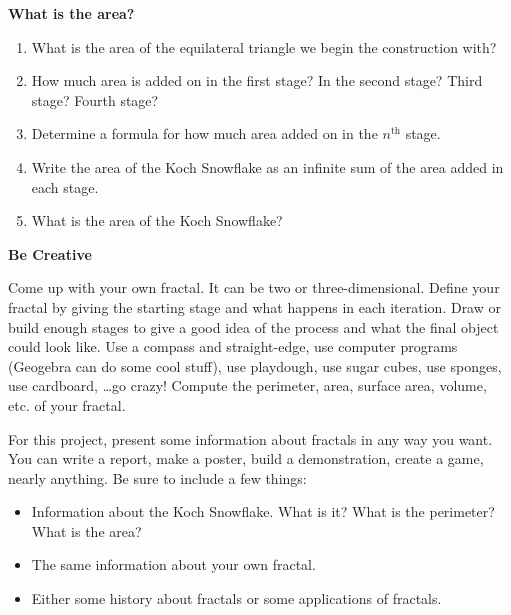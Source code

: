 \documentclass[12pt]{amsart}
\begin{document}
\vfill

{\bf What is the area?}

\medskip

\begin{enumerate}

\item  What is the area of the equilateral triangle we begin the construction with?

\bigskip

\item  How much area is added on in the first stage?  In the second stage? Third stage? Fourth stage? 

\bigskip

\item  Determine a formula for how much area added on in the $n^\text{th}$ stage.

\bigskip

\item  Write the area of the Koch Snowflake as an infinite sum of the area added in each stage.

\bigskip

\item  What is the area of the Koch Snowflake?

\bigskip

\end{enumerate}

\vfill

{\bf Be Creative}

\medskip

Come up with your own fractal.  It can be two or three-dimensional.  Define your fractal by giving the starting stage and what happens in each iteration.  Draw or build enough stages to give a good idea of the process and what the final object could look like.  Use a compass and straight-edge, use computer programs (Geogebra can do some cool stuff), use playdough, use sugar cubes, use sponges, use cardboard, \dots go crazy!  Compute the perimeter, area, surface area, volume, etc. of your fractal.

\vfill

\newpage

For this project, present some information about fractals in any way you want.  You can write a report, make a poster, build a demonstration, create a game, nearly anything.  Be sure to include a few things:

\medskip

\begin{itemize}

\item  Information about the Koch Snowflake.  What is it?  What is the perimeter?  What is the area?

\item  The same information about your own fractal.

\item  Either some history about fractals or some applications of fractals.

\end{itemize}
\end{document}
